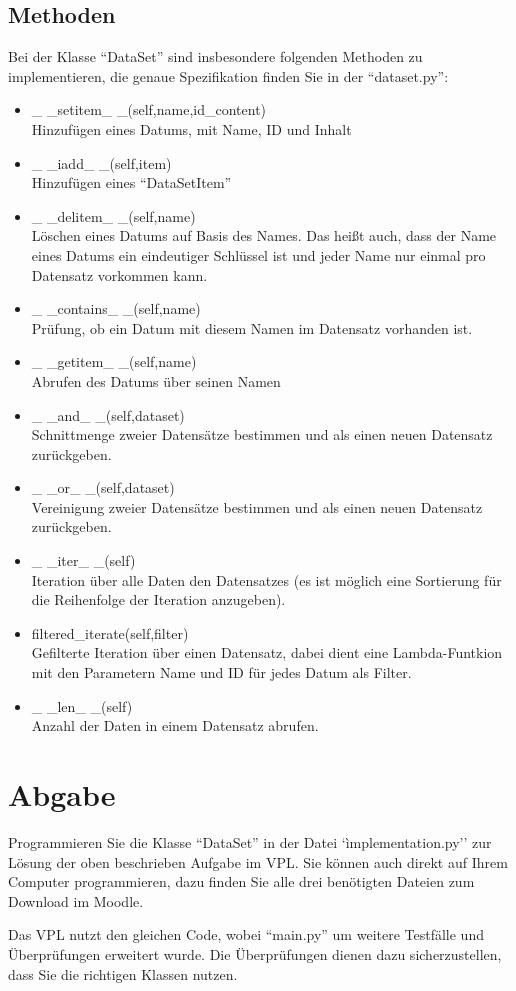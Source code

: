 \documentclass[
 oneside, %
 12pt, %
 a4paper, %
 parskip=full %
]{scrartcl}
\begin{document}
\subsection{Methoden}
Bei der Klasse ``DataSet'' sind insbesondere folgenden Methoden zu implementieren, die genaue Spezifikation finden Sie in der ``dataset.py'':
\begin{itemize}
    \item \_ \_setitem\_ \_(self,name,id\_content) \\
    Hinzufügen eines Datums, mit Name, ID und Inhalt
    \item \_ \_iadd\_ \_(self,item) \\
    Hinzufügen eines ``DataSetItem''
    \item \_ \_delitem\_ \_(self,name) \\
    Löschen eines Datums auf Basis des Names.
    Das heißt auch, dass der Name eines Datums ein eindeutiger Schlüssel ist und jeder Name nur einmal pro Datensatz vorkommen kann.
    \item \_ \_contains\_ \_(self,name)\\
    Prüfung, ob ein Datum mit diesem Namen im Datensatz vorhanden ist.
    \item \_ \_getitem\_ \_(self,name) \\
    Abrufen des Datums über seinen Namen
    \item \_ \_and\_ \_(self,dataset) \\
    Schnittmenge zweier Datensätze bestimmen und als einen neuen Datensatz zurückgeben.
    \item \_ \_or\_ \_(self,dataset) \\
    Vereinigung zweier Datensätze bestimmen und als einen neuen Datensatz zurückgeben.
    \item \_ \_iter\_ \_(self) \\
    Iteration über alle Daten den Datensatzes (es ist möglich eine Sortierung für die Reihenfolge der Iteration anzugeben).
    \item filtered\_iterate(self,filter) \\
    Gefilterte Iteration über einen Datensatz, dabei dient eine Lambda-Funtkion mit den Parametern Name und ID für jedes Datum als Filter.
    \item \_ \_len\_ \_(self) \\
    Anzahl der Daten in einem Datensatz abrufen.
\end{itemize}
\section{Abgabe}
Programmieren Sie die Klasse ``DataSet'' in der Datei `ìmplementation.py'' zur Lösung der oben beschrieben Aufgabe im VPL. Sie können auch direkt auf Ihrem Computer programmieren, dazu finden Sie alle drei benötigten Dateien zum Download im Moodle.

Das VPL nutzt den gleichen Code, wobei ``main.py'' um weitere Testfälle und Überprüfungen erweitert wurde. Die Überprüfungen dienen dazu sicherzustellen, dass Sie die richtigen Klassen nutzen.
\end{document}
